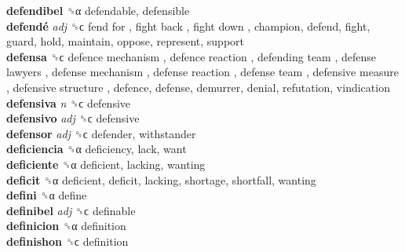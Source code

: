 \textbf{defendibel} ␝α  defendable, defensible  \\
\textbf{defendé} \emph{adj}  ␝ϲ   fend for ,  fight back ,  fight down , champion, defend, fight, guard, hold, maintain, oppose, represent, support  \\
\textbf{defensa} ␝ϲ   defence mechanism ,  defence reaction ,  defending team ,  defense lawyers ,  defense mechanism ,  defense reaction ,  defense team ,  defensive measure ,  defensive structure , defence, defense, demurrer, denial, refutation, vindication  \\
\textbf{defensiva} \emph{n}  ␝ϲ  defensive  \\
\textbf{defensivo} \emph{adj}  ␝ϲ  defensive  \\
\textbf{defensor} \emph{adj}  ␝ϲ  defender, withstander  \\
\textbf{deficiencia} ␝α  deficiency, lack, want  \\
\textbf{deficiente} ␝α  deficient, lacking, wanting  \\
\textbf{deficit} ␝α  deficient, deficit, lacking, shortage, shortfall, wanting  \\
\textbf{defini} ␝α  define  \\
\textbf{definibel} \emph{adj}  ␝ϲ  definable  \\
\textbf{definicion} ␝α  definition  \\
\textbf{definishon} ␝ϲ  definition  \\
